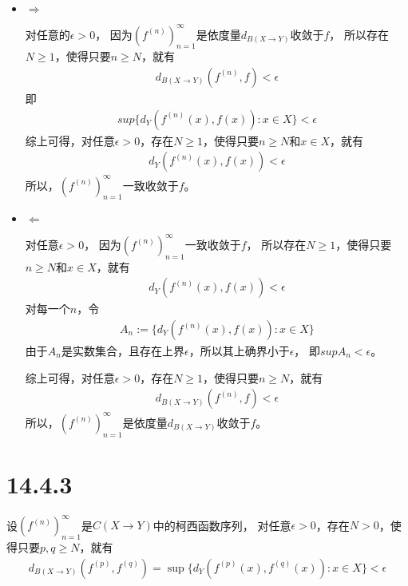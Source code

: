 \documentclass{article}
\begin{document}
\begin{itemize}
  \item $\Rightarrow$

        对任意的$\epsilon > 0$，
        因为$(f^{(n)})_{n = 1}^\infty$是依度量$d_{B(X \to Y)}$收敛于$f$，
        所以存在$N \geq 1$，使得只要$n \geq N$，就有
        \begin{align*}
          d_{B(X \to Y)}(f^{(n)}, f) < \epsilon
        \end{align*}
        即
        \begin{align*}
          sup\{d_Y(f^{(n)}(x), f(x)) : x \in X\} < \epsilon
        \end{align*}
        综上可得，对任意$\epsilon > 0$，存在$N \geq 1$，使得只要$n \geq N$和$x \in X$，就有
        \begin{align*}
          d_Y(f^{(n)}(x), f(x)) < \epsilon
        \end{align*}
        所以，$(f^{(n)})_{n = 1}^\infty$一致收敛于$f$。

  \item $\Leftarrow$

        对任意$\epsilon > 0$，
        因为$(f^{(n)})_{n = 1}^\infty$一致收敛于$f$，
        所以存在$N \geq 1$，使得只要$n \geq N$和$x \in X$，就有
        \begin{align*}
          d_Y(f^{(n)}(x), f(x)) < \epsilon
        \end{align*}
        对每一个$n$，令
        \begin{align*}
          A_n := \{d_Y(f^{(n)}(x), f(x)): x \in X\}
        \end{align*}
        由于$A_n$是实数集合，且存在上界$\epsilon$，所以其上确界小于$\epsilon$，
        即$sup A_n < \epsilon$。

        综上可得，对任意$\epsilon > 0$，存在$N \geq 1$，使得只要$n \geq N$，就有
        \begin{align*}
          d_{B(X \to Y)}(f^{(n)}, f) < \epsilon
        \end{align*}
        所以，$(f^{(n)})_{n = 1}^\infty$是依度量$d_{B(X \to Y)}$收敛于$f$。

\end{itemize}

\section*{14.4.3}

设$(f^{(n)})_{n = 1}^\infty$是$C(X \to Y)$中的柯西函数序列，
对任意$\epsilon > 0$，存在$N > 0$，使得只要$p, q \geq N$，就有
\begin{align*}
  d_{B(X \to Y)}(f^{(p)}, f^{(q)}) = \sup\{d_Y(f^{(p)}(x), f^{(q)}(x)): x \in X\} < \epsilon
\end{align*}
\end{document}
